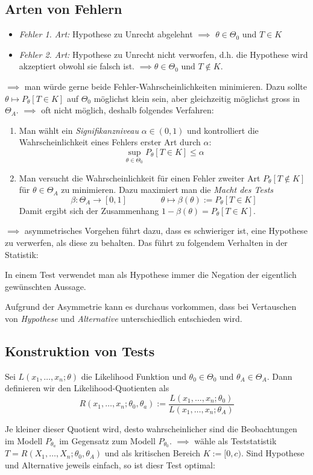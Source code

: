 \subsection*{Arten von Fehlern}
\begin{itemize}
\item \textit{Fehler 1. Art:} Hypothese zu Unrecht abgelehnt $\implies$ $\theta \in \Theta_0$ und $T\in K$
\item \textit{Fehler 2. Art:} Hypothese zu Unrecht nicht verworfen, d.h. die Hypothese wird akzeptiert obwohl sie falsch ist. $\implies \theta \in \Theta_0$ und $T\notin K$.
\end{itemize}
$\implies$ man würde gerne beide Fehler-Wahrscheinlichkeiten minimieren. Dazu sollte $\theta \mapsto P_\theta[T \in K]$ auf $\Theta_0$ möglichst klein sein, aber gleichzeitig möglichst gross in $\Theta_A$. $\implies$ oft nicht möglich, deshalb folgendes Verfahren:
\begin{enumerate}
\item Man wählt ein \textit{Signifikanzniveau} $\alpha \in (0,1)$ und kontrolliert die Wahrscheinlichkeit eines Fehlers erster Art durch $\alpha$:
$$ \sup_{\theta \in \Theta_0} P_\theta [T \in K] \leq \alpha $$
\item Man versucht die Wahrscheinlichkeit für einen Fehler zweiter Art $P_\theta[T \notin K]$ für $\theta \in \Theta_A$ zu minimieren. Dazu maximiert man die \textit{Macht des Tests} $$\beta:\Theta_A \to [0,1] \quad \quad \quad \quad \theta \mapsto \beta(\theta) := P_\theta[T \in K]$$
Damit ergibt sich der Zusammenhang $1-\beta(\theta) = P_\theta[T \in K]$.
\end{enumerate}

$\implies$ asymmetrisches Vorgehen führt dazu, dass es schwieriger ist, eine Hypothese zu verwerfen, als diese zu behalten. Das führt zu folgendem Verhalten in der Statistik:
\begin{mdframed}[backgroundcolor=red!20]
In einem Test verwendet man als Hypothese immer die Negation der eigentlich gewünschten Aussage.
\end{mdframed}
Aufgrund der Asymmetrie kann es durchaus vorkommen, dass bei Vertauschen von \textit{Hypothese} und \textit{Alternative} unterschiedlich entschieden wird.

\subsection{Konstruktion von Tests}
\begin{definition}
Sei $L(x_1,\dots,x_n;\theta)$ die Likelihood Funktion und $\theta_0 \in \Theta_0$ und $\theta_A \in \Theta_A$. Dann definieren wir den Likelihood-Quotienten als
$$ R(x_1,\dots,x_n; \theta_0, \theta_a ) := \frac{L(x_1,\dots,x_n; \theta_0)}{L(x_1,\dots,x_n;\theta_A)}$$
\end{definition}
Je kleiner dieser Quotient wird, desto wahrscheinlicher sind die Beobachtungen im Modell $P_{\theta_a}$ im Gegensatz zum Modell $P_{\theta_0}$. $\implies$ wähle als Teststatistik $T= R(X_1,\dots, X_n; \theta_0, \theta_A)$ und als kritischen Bereich $K:=[0,c)$. Sind Hypothese und Alternative jeweils einfach, so ist diesr Test optimal:

